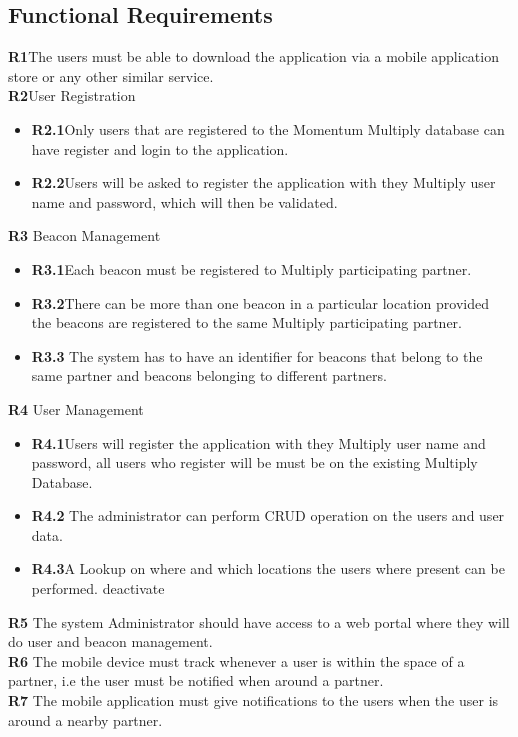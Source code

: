 \documentclass[11pt]{article}
\begin{document}
\subsection{Functional Requirements}
\textbf{R1}The users must be able to download the application via a mobile application store or any other similar service.\\
\textbf{R2}User Registration
\begin{itemize}	
	\item \textbf{R2.1}Only users that are registered to the Momentum Multiply database can have register and login to the application.
	\item \textbf{R2.2}Users will be asked to register the application with they Multiply user name and password, which will then be validated.
\end{itemize}
\textbf{R3} Beacon Management
\begin{itemize}	
	\item \textbf{R3.1}Each beacon must be registered to Multiply participating partner.
	\item 	\textbf{R3.2}There can be more than one beacon in a particular location provided the beacons are registered to the same Multiply participating partner.
	\item \textbf{R3.3} The system has to have an identifier for beacons that belong to the same partner and beacons belonging to different partners.
	
\end{itemize}
\textbf{R4} User Management
\begin{itemize}	
	\item \textbf{R4.1}Users will register the application with they Multiply user name and password, all users who register will be must be on the existing Multiply Database. 
	\item \textbf{R4.2} The administrator can perform CRUD operation on the users and user data. 
	\item \textbf{R4.3}A Lookup on where and which locations the users where present can be performed.
	 deactivate 
\end{itemize}
\textbf{R5} The system Administrator should have access to a web portal where they will do user and beacon management. \\
\textbf{R6} The mobile device must track whenever a user is within the space of a partner, i.e the user must be notified when around a partner. \\
\textbf{R7} The mobile application must give notifications to the users when the user is around a nearby partner. \\
\end{document}
